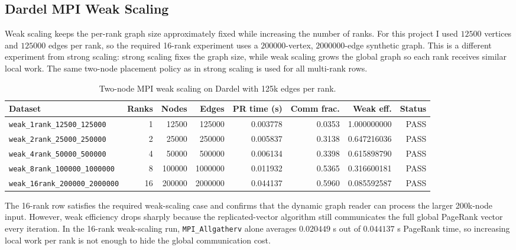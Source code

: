 \documentclass[11pt]{article}
\begin{document}
\subsection{Dardel MPI Weak Scaling}
\label{subsec:wang-dardel-weak}

Weak scaling keeps the per-rank graph size approximately fixed while increasing
the number of ranks. For this project I used $12500$ vertices and $125000$
edges per rank, so the required 16-rank experiment uses a
$200000$-vertex, $2000000$-edge synthetic graph. This is a different
experiment from strong scaling: strong scaling fixes the graph size, while weak
scaling grows the global graph so each rank receives similar local work.
The same two-node placement policy as in strong scaling is used for all
multi-rank rows.

\begin{table}[H]
\centering
\caption{Two-node MPI weak scaling on Dardel with 125k edges per rank.}
\label{tab:wang-dardel-weak}
\scriptsize
\begin{tabular}{lrrrrrrr}
\toprule
Dataset & Ranks & Nodes & Edges & PR time (s) & Comm frac. & Weak eff. & Status \\
\midrule
\texttt{weak\_1rank\_12500\_125000}    & 1  & 12500  & 125000  & 0.003778 & 0.0353 & 1.000000000 & PASS \\
\texttt{weak\_2rank\_25000\_250000}    & 2  & 25000  & 250000  & 0.005837 & 0.3138 & 0.647216036 & PASS \\
\texttt{weak\_4rank\_50000\_500000}    & 4  & 50000  & 500000  & 0.006134 & 0.3398 & 0.615898790 & PASS \\
\texttt{weak\_8rank\_100000\_1000000}  & 8  & 100000 & 1000000 & 0.011932 & 0.5365 & 0.316600181 & PASS \\
\texttt{weak\_16rank\_200000\_2000000} & 16 & 200000 & 2000000 & 0.044137 & 0.5960 & 0.085592587 & PASS \\
\bottomrule
\end{tabular}
\end{table}

The 16-rank row satisfies the required weak-scaling case and confirms that the
dynamic graph reader can process the larger 200k-node input. However, weak
efficiency drops sharply because the replicated-vector algorithm still
communicates the full global PageRank vector every iteration. In the 16-rank
weak-scaling run, \texttt{MPI\_Allgatherv} alone averages $0.020449$ s out of
$0.044137$ s PageRank time, so increasing local work per rank is not enough to
hide the global communication cost.
\end{document}
